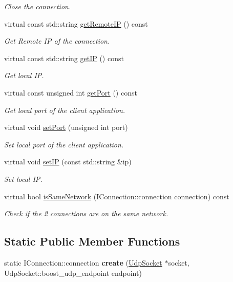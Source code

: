 \begin{DoxyCompactItemize}
\begin{DoxyCompactList}\small\item\em Close the connection. \end{DoxyCompactList}\item 
virtual const std\-::string \hyperlink{class_udp_connection_a41e5801973dd69910fcbd7dab11df5c3}{get\-Remote\-I\-P} () const 
\begin{DoxyCompactList}\small\item\em Get Remote I\-P of the connection. \end{DoxyCompactList}\item 
virtual const std\-::string \hyperlink{class_udp_connection_a0efddfd41ef2789199133eedf1848988}{get\-I\-P} () const 
\begin{DoxyCompactList}\small\item\em Get local I\-P. \end{DoxyCompactList}\item 
virtual const unsigned int \hyperlink{class_udp_connection_a56385a5013e0a3c87166cd8d7e459e51}{get\-Port} () const 
\begin{DoxyCompactList}\small\item\em Get local port of the client application. \end{DoxyCompactList}\item 
virtual void \hyperlink{class_udp_connection_a04fe1075d98e4bd39158ad4d3f04a336}{set\-Port} (unsigned int port)
\begin{DoxyCompactList}\small\item\em Set local port of the client application. \end{DoxyCompactList}\item 
virtual void \hyperlink{class_udp_connection_a7e511d2ab27459d897a646b7d474a93c}{set\-I\-P} (const std\-::string \&ip)
\begin{DoxyCompactList}\small\item\em Set local I\-P. \end{DoxyCompactList}\item 
virtual bool \hyperlink{class_udp_connection_a97217e5efee70a1e2717b94e0d7574d7}{is\-Same\-Network} (I\-Connection\-::connection connection) const 
\begin{DoxyCompactList}\small\item\em Check if the 2 connections are on the same network. \end{DoxyCompactList}\end{DoxyCompactItemize}
\subsection*{Static Public Member Functions}
\begin{DoxyCompactItemize}
\item 
\hypertarget{class_udp_connection_a2c5db545939dad01d04f0295776561b5}{static I\-Connection\-::connection {\bfseries create} (\hyperlink{class_udp_socket}{Udp\-Socket} $\ast$socket, Udp\-Socket\-::boost\-\_\-udp\-\_\-endpoint endpoint)}\label{class_udp_connection_a2c5db545939dad01d04f0295776561b5}

\end{DoxyCompactItemize}
